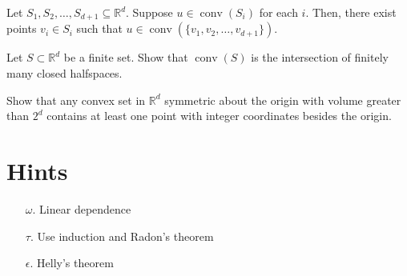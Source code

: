 \documentclass{article}
\DeclareMathOperator{\conv}{conv}
\begin{document}
\begin{exercise}

Let $S_1,S_2,\ldots,S_{d+1}\subseteq\mathbb{R}^d$. Suppose $u\in\conv(S_i)$ for each $i$. Then, there exist points $v_i\in S_i$ such that $u\in\conv(\{v_1,v_2,\ldots,v_{d+1}\})$.

\end{exercise}



\begin{exercise}

Let $S\subset\mathbb{R}^d$ be a finite set. Show that $\conv(S)$ is the intersection of finitely many closed halfspaces.

\end{exercise}



\begin{exercise}

Show that any convex set in $\mathbb{R}^d$ symmetric about the origin with volume greater than $2^d$ contains at least one point with integer coordinates besides the origin.

\end{exercise}



\section{Hints}

\begin{enumerate}

    \item[$\omega$.] Linear dependence

    \item[$\tau$.] Use induction and Radon's theorem

    \item[$\epsilon$.] Helly's theorem

\end{enumerate}
\end{document}
